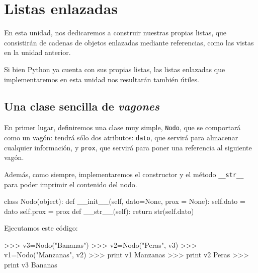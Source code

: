 
%

\chapter{Listas enlazadas}

En esta unidad, nos dedicaremos a construir nuestras propias listas, que
consistirán de cadenas de objetos enlazadas mediante referencias, como las
vistas en la unidad anterior.

Si bien Python ya cuenta con sus propias listas, las listas enlazadas que
implementaremos en esta unidad nos resultarán también útiles.

\section{Una clase sencilla de {\it vagones}}

En primer lugar, definiremos una clase muy simple, \lstinline!Nodo!, que se
comportará como un vagón: tendrá sólo dos atributos: \lstinline!dato!, que
servirá para almacenar cualquier información, y \lstinline!prox!, que servirá
para poner una referencia al siguiente vagón.

Además, como siempre, implementaremos el constructor y el método
\lstinline!__str__! para poder imprimir el contenido del nodo.

\begin{codigo-python-sn}
class Nodo(object):
    def __init__(self, dato=None, prox = None):
        self.dato = dato
        self.prox = prox
    def __str__(self):
        return str(self.dato)
\end{codigo-python-sn}

Ejecutamos este código:

\begin{codigo-python-sn}
>>> v3=Nodo("Bananas")
>>> v2=Nodo("Peras", v3)
>>> v1=Nodo("Manzanas", v2)
>>> print v1
Manzanas
>>> print v2
Peras
>>> print v3
Bananas
\end{codigo-python-sn}

